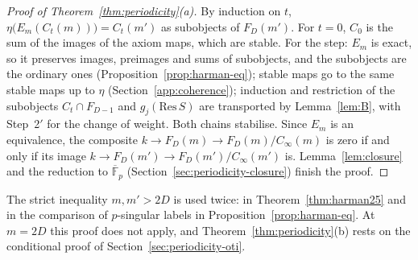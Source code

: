 \begin{proof}[Proof of Theorem~\ref{thm:periodicity}(a)]
By induction on $t$, $\eta\bigl(E_m(C_t(m))\bigr)=C_t(m')$ as subobjects of $F_D(m')$.  For
$t=0$, $C_0$ is the sum of the images of the axiom maps, which are stable.  For the step: $E_m$
is exact, so it preserves images, preimages and sums of subobjects, and the subobjects are the
ordinary ones (Proposition~\ref{prop:harman-eq}); stable maps go to the same stable maps up to
$\eta$ (Section~\ref{app:coherence}); induction and restriction of the subobjects
$C_t\cap F_{D-1}$ and $g_j(\mathrm{Res}\,S)$ are transported by Lemma~\ref{lem:B}, with
Step~2$'$ for the change of weight.  Both chains stabilise.  Since $E_m$ is an equivalence, the
composite $k\to F_D(m)\to F_D(m)/C_\infty(m)$ is zero if and only if its image
$k\to F_D(m')\to F_D(m')/C_\infty(m')$ is.  Lemma~\ref{lem:closure} and the reduction to
$\overline{\mathbb F}_p$ (Section~\ref{sec:periodicity-closure}) finish the proof.
\end{proof}

The strict inequality $m,m'>2D$ is used twice: in Theorem~\ref{thm:harman25} and in the
comparison of $p$-singular labels in Proposition~\ref{prop:harman-eq}.  At $m=2D$ this proof
does not apply, and Theorem~\ref{thm:periodicity}(b) rests on the conditional proof of
Section~\ref{sec:periodicity-oti}.
